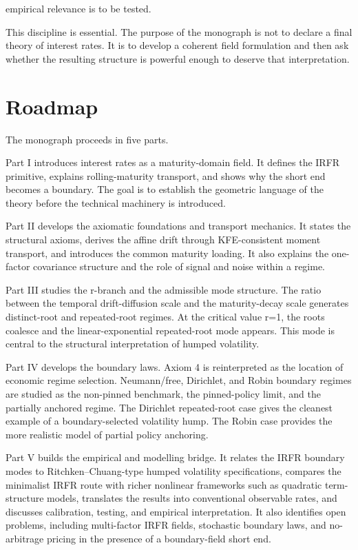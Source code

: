 \documentclass[11pt,oneside]{book}
\begin{document}
empirical relevance is to be tested.

This discipline is essential. The purpose of the monograph is not to
declare a final theory of interest rates. It is to develop a coherent
field formulation and then ask whether the resulting structure is
powerful enough to deserve that interpretation.

\section{Roadmap}\label{roadmap}

The monograph proceeds in five parts.

Part I introduces interest rates as a maturity-domain field. It defines
the IRFR primitive, explains rolling-maturity transport, and shows why
the short end becomes a boundary. The goal is to establish the geometric
language of the theory before the technical machinery is introduced.

Part II develops the axiomatic foundations and transport mechanics. It
states the structural axioms, derives the affine drift through
KFE-consistent moment transport, and introduces the common maturity
loading. It also explains the one-factor covariance structure and the
role of signal and noise within a regime.

Part III studies the r-branch and the admissible mode structure. The
ratio between the temporal drift-diffusion scale and the maturity-decay
scale generates distinct-root and repeated-root regimes. At the critical
value r=1, the roots coalesce and the linear-exponential repeated-root
mode appears. This mode is central to the structural interpretation of
humped volatility.

Part IV develops the boundary laws. Axiom 4 is reinterpreted as the
location of economic regime selection. Neumann/free, Dirichlet, and
Robin boundary regimes are studied as the non-pinned benchmark, the
pinned-policy limit, and the partially anchored regime. The Dirichlet
repeated-root case gives the cleanest example of a boundary-selected
volatility hump. The Robin case provides the more realistic model of
partial policy anchoring.

Part V builds the empirical and modelling bridge. It relates the IRFR
boundary modes to Ritchken--Chuang-type humped volatility specifications,
compares the minimalist IRFR route with richer nonlinear frameworks such
as quadratic term-structure models, translates the results into
conventional observable rates, and discusses calibration, testing, and
empirical interpretation. It also identifies open problems, including
multi-factor IRFR fields, stochastic boundary laws, and no-arbitrage
pricing in the presence of a boundary-field short end.
\end{document}
